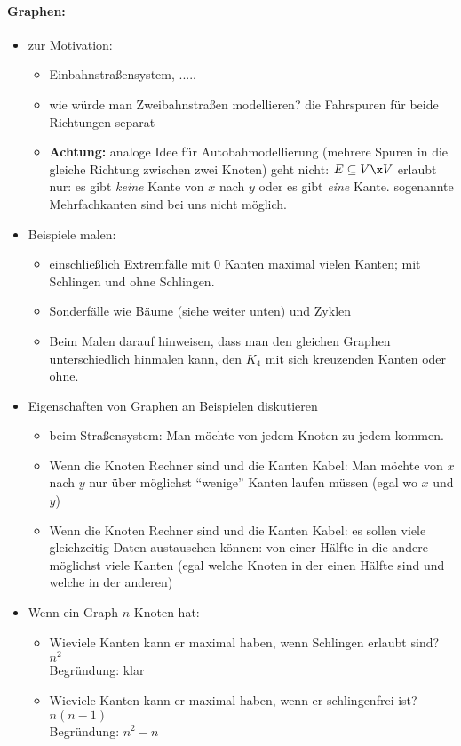 \begin{tutorium}
  \paragraph{Graphen:}
  \begin{itemize}
  \item zur Motivation:
    \begin{itemize}
    \item Einbahnstraßensystem, .....
    \item wie würde man Zweibahnstraßen modellieren? die Fahrspuren
      für beide Richtungen separat
    \item \textbf{Achtung:} analoge Idee für Autobahmodellierung
      (mehrere Spuren in die gleiche Richtung zwischen zwei Knoten)
      geht nicht: $E\subseteq V\x V$ erlaubt nur: es gibt \emph{keine}
      Kante von $x$ nach $y$ oder es gibt \emph{eine} Kante.
      sogenannte Mehrfachkanten sind bei uns nicht möglich.
    \end{itemize}
  \item Beispiele malen:
    \begin{itemize}
    \item einschließlich Extremfälle mit $0$ Kanten \bzw maximal
      vielen Kanten; mit Schlingen und ohne Schlingen.
    \item Sonderfälle wie Bäume (siehe weiter unten) und Zyklen
    \item Beim Malen darauf hinweisen, dass man den gleichen Graphen
      unterschiedlich hinmalen kann, \zB den $K_4$ mit sich kreuzenden
      Kanten oder ohne.
    \end{itemize}
  \item Eigenschaften von Graphen an Beispielen diskutieren
    \begin{itemize}
    \item beim Straßensystem: Man möchte von jedem Knoten zu jedem
      kommen.
    \item Wenn die Knoten Rechner sind und die Kanten Kabel: Man
      möchte von $x$ nach $y$ nur über möglichst "`wenige"' Kanten
      laufen müssen (egal wo $x$ und $y$)
    \item Wenn die Knoten Rechner sind und die Kanten Kabel: es sollen
      viele gleichzeitig Daten austauschen können: von einer Hälfte in
      die andere möglichst viele Kanten (egal welche Knoten in der
      einen Hälfte sind und welche in der anderen)
    \end{itemize}
  \item Wenn ein Graph $n$ Knoten hat:
    \begin{itemize}
    \item Wieviele Kanten kann er maximal haben, wenn Schlingen
      erlaubt sind? $n^2$ \\ Begründung: klar
    \item Wieviele Kanten kann er maximal haben, wenn er schlingenfrei
      ist? $n(n-1)$ \\ Begründung: $n^2-n$
    \end{itemize}
  \end{itemize}
\end{tutorium}
